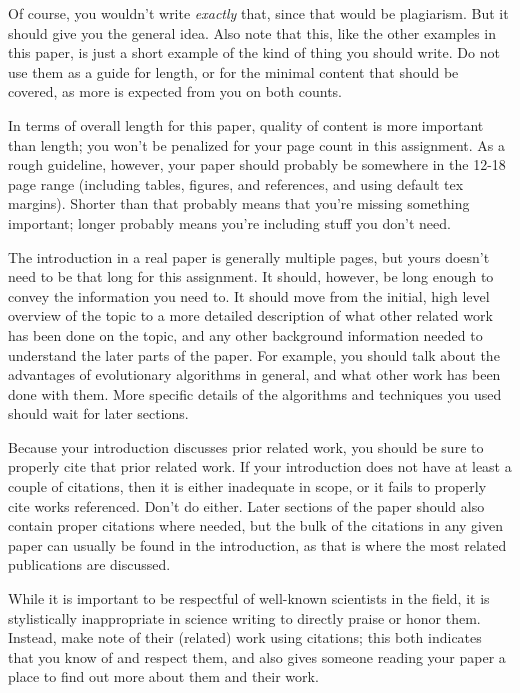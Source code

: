 \documentclass[12pt, letterpaper]{article}
\begin{document}
Of course, you wouldn't write \emph{exactly} that, since that would be
plagiarism.  But it should give you the general idea.  Also note that this, like
the other examples in this paper, is just a short example of the kind of thing
you should write.  Do not use them as a guide for length, or for the minimal
content that should be covered, as more is expected from you on both counts.

In terms of overall length for this paper, quality of content is more important
than length; you won't be penalized for your page count in this assignment.  As
a rough guideline, however, your paper should probably be somewhere in the 12-18
page range (including tables, figures, and references, and using default tex
margins).  Shorter than that probably means that you're missing something
important; longer probably means you're including stuff you don't need.

The introduction in a real paper is generally multiple pages, but yours doesn't
need to be that long for this assignment.  It should, however, be long enough to
convey the information you need to.  It should move from the initial, high level
overview of the topic to a more detailed description of what other related work
has been done on the topic, and any other background information needed to
understand the later parts of the paper.  For example, you should talk about the
advantages of evolutionary algorithms in general, and what other work has been
done with them.  More specific details of the algorithms and techniques you used
should wait for later sections.

Because your introduction discusses prior related work, you should be sure to
properly cite that prior related work.  If your introduction does not have at
least a couple of citations, then it is either inadequate in scope, or it fails
to properly cite works referenced.  Don't do either.  Later sections of the
paper should also contain proper citations where needed, but the bulk of the
citations in any given paper can usually be found in the introduction, as that
is where the most related publications are discussed.

While it is important to be respectful of well-known scientists in the field, it
is stylistically inappropriate in science writing to directly praise or honor
them.  Instead, make note of their (related) work using citations; this both
indicates that you know of and respect them, and also gives someone reading your
paper a place to find out more about them and their work.
\end{document}
